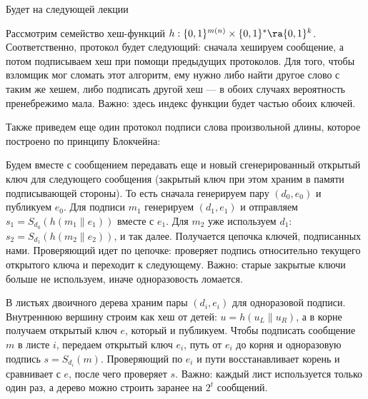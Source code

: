 \begin{definition}
    Будет на следующей лекции
\end{definition}

\begin{example}
    Рассмотрим семейство хеш-функций \(h:\{0, 1\}^{m(n)} \times \{0, 1\}^* \ra \{0, 1\}^k\). Соответственно, протокол будет следующий: сначала хешируем сообщение, а потом подписываем хеш при помощи предыдущих протоколов. Для того, чтобы взломщик мог сломать этот алгоритм, ему нужно либо найти другое слово с таким же хешем, либо подписать другой хеш --- в обоих случаях вероятность пренебрежимо мала. Важно: здесь индекс функции будет частью обоих ключей.
\end{example}

Также приведем еще один протокол подписи слова произвольной длины, которое построено по принципу Блокчейна:

\begin{example}
    Будем вместе с сообщением передавать еще и новый сгенерированный открытый ключ для следующего сообщения (закрытый ключ при этом храним в памяти подписывающей стороны). То есть сначала генерируем пару \((d_0, e_0)\) и публикуем \(e_0\). Для подписи \(m_1\) генерируем \((d_1, e_1)\) и отправляем \(s_1 = S_{d_0}(h(m_1 \| e_1))\) вместе с \(e_1\). Для \(m_2\) уже используем \(d_1\): \(s_2 = S_{d_1}(h(m_2 \| e_2))\), и так далее. Получается цепочка ключей, подписанных нами. Проверяющий идет по цепочке: проверяет подпись относительно текущего открытого ключа и переходит к следующему. Важно: старые закрытые ключи больше не используем, иначе одноразовость ломается.
\end{example}

\begin{example}
    В листьях двоичного дерева храним пары \((d_i, e_i)\) для одноразовой подписи. Внутреннюю вершину строим как хеш от детей: \(u = h(u_L \| u_R)\), а в корне получаем открытый ключ \(e\), который и публикуем. Чтобы подписать сообщение \(m\) в листе \(i\), передаем открытый ключ \(e_i\), путь от \(e_i\) до корня и одноразовую подпись \(s = S_{d_i}(m)\). Проверяющий по \(e_i\) и пути восстанавливает корень и сравнивает с \(e\), после чего проверяет \(s\). Важно: каждый лист используется только один раз, а дерево можно строить заранее на \(2^t\) сообщений.
\end{example}

